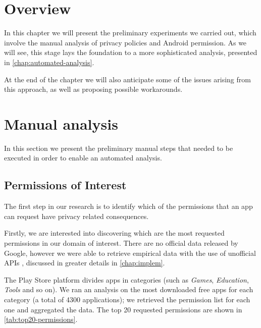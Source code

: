 
\section{Overview}
\label{sec:overview}
In this chapter we will present the preliminary experiments we carried out, which involve the manual analysis of privacy policies and Android permission.
As we will see, this stage lays the foundation to a more sophisticated analysis, presented in \autoref{chap:automated-analysis}.

At the end of the chapter we will also anticipate some of the issues arising from this approach, as well as proposing possible workarounds.

\section{Manual analysis}
In this section we present the preliminary manual steps that needed to be executed in order to enable an automated analysis.

\subsection{Permissions of Interest}
The first step in our research is to identify which of the permissions that an app can request have privacy related consequences.

Firstly, we are interested into discovering which are the most requested permissions in our domain of interest.
There are no official data released by Google, however we were able to retrieve empirical data with the use of
unofficial APIs \cite{play-store-unofficial-api}, discussed in greater details in \autoref{chap:implem}.

The Play Store platform divides apps in categories (such as \emph{Games}, \emph{Education}, \emph{Tools} and so on). We ran
an analysis on the most downloaded free apps for each category (a total of 4300 applications);
we retrieved the permission list for each one and aggregated the data. The top 20 requested permissions are shown in \autoref{tab:top20-permissions}.

